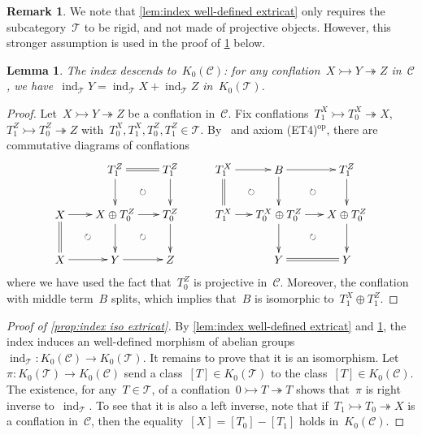 \documentclass{amsart}
\newtheorem{lemma}[theorem]{Lemma}
\theoremstyle{definition}
\newtheorem{remark}[theorem]{Remark}
\newcommand{\cat}{\mathcal{C}}
\newcommand{\ind}{\operatorname{ind}}
\newcommand{\tc}{\mathcal{T}}
\newcommand{\infl}{\rightarrowtail}
\newcommand{\defl}{\twoheadrightarrow}
\newcommand{\kzero}[1]{K_0(#1)}
\begin{document}
\begin{remark}
We note that \cref{lem:index well-defined extricat} only requires the subcategory~$\tc$ to be rigid, and not made of projective objects.
However, this stronger assumption is used in the proof of \cref{lem:index kzero extricat} below.
\end{remark}

\begin{lemma}
\label{lem:index kzero extricat}
The index descends to~$\kzero{\cat}$: for any conflation~$X\infl Y\defl Z$ in~$\cat$, we have~$\ind_\tc Y = \ind_\tc X + \ind_\tc Z$ in~$\kzero{\tc}$.
\end{lemma}

\begin{proof}
Let~$X\infl Y\defl Z$ be a conflation in~$\cat$.
Fix conflations~$T_1^X \infl T_0^X \defl X$,~$T_1^Z\infl T_0^Z \defl Z$ with~$T_0^X, T_1^X, T_0^Z, T_1^Z\in\tc$.
By~\cite[Prop.~3.15]{NakaokaPalu} and axiom (ET4)$^{\mathrm{op}}$, there are commutative diagrams of conflations
\[
\xy
%
(-7,21)*+{T^Z_1}="-12";
(10,21)*+{T^Z_1}="-14";
%
(-24,7)*+{X}="0";
(-7,7)*+{X\oplus T^Z_0}="2";
(10,7)*+{T^Z_0}="4";
%
(-24,-7)*+{X}="10";
(-7,-7)*+{Y}="12";
(10,-7)*+{Z}="14";
%
{\ar@{=} "-12";"-14"};
%
{\ar "-12";"2"};
{\ar "-14";"4"};
%
{\ar "0";"2"};
{\ar "2";"4"};
%
{\ar@{=} "0";"10"};
{\ar "2";"12"};
{\ar "4";"14"};
%
{\ar "10";"12"};
{\ar "12";"14"};
%
{\ar@{}|\circlearrowright "-12";"4"};
{\ar@{}|\circlearrowright "0";"12"};
{\ar@{}|\circlearrowright "2";"14"};
\endxy
\quad \quad \ \
\xy
(-24,21)*+{T^X_1}="0";
(-7,21)*+{B}="2";
(14,21)*+{T^Z_1}="4";
%
(-24,7)*+{T^X_1}="10";
(-7,7)*+{T^X_0\oplus T^Z_0}="12";
(14,7)*+{X\oplus T^Z_0}="14";
%
(-7,-7)*+{Y}="22";
(14,-7)*+{Y}="24";
%
%
{\ar "0";"2"};
{\ar "2";"4"};
%
{\ar@{=} "0";"10"};
{\ar "2";"12"};
{\ar "4";"14"};
%
{\ar "10";"12"};
{\ar "12";"14"};
%
{\ar "12";"22"};
{\ar "14";"24"};
%
{\ar@{=} "22";"24"};
%
{\ar@{}|\circlearrowright "0";"12"};
{\ar@{}|\circlearrowright "2";"14"};
{\ar@{}|\circlearrowright "12";"24"};
\endxy
\]
where we have used the fact that~$T_0^Z$ is projective in~$\cat$.
Moreover, the conflation with middle term~$B$ splits, which implies that~$B$ is isomorphic to~$T_1^X\oplus T_1^Z$.
\end{proof}

\begin{proof}[Proof of \cref{prop:index iso extricat}]
By \cref{lem:index well-defined extricat} and \cref{lem:index kzero extricat}, the index induces an well-defined morphism of abelian groups~$\ind_\tc:\kzero{\cat}\to\kzero{\tc}$.
It remains to prove that it is an isomorphism.
Let~$\pi:\kzero{\tc}\to\kzero{\cat}$ send a class~$[T]\in\kzero{\tc}$ to the class~$[T]\in\kzero{\cat}$.
The existence, for any~$T\in\tc$, of a conflation~$0\infl T\defl T$ shows that~$\pi$ is right inverse to~$\ind_\tc$.
To see that it is also a left inverse, note that if~$T_1\infl T_0\defl X$ is a conflation in~$\cat$, then the equality~$[X]=[T_0]-[T_1]$ holds in~$\kzero{\cat}$.
\end{proof}
\end{document}
